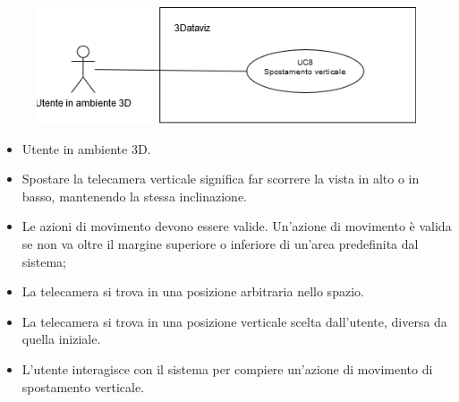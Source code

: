     \begin{figure}[h!]
        \centering
        \includegraphics[scale=0.65]{template/images/UC8.png}
        \caption{}
    \end{figure}
    \UCdsc
        { %
            \begin{itemize}
                \item Utente in ambiente 3D.
            \end{itemize}
        }
        { %
            \begin{itemize}
                \item Spostare la telecamera verticale significa far scorrere la vista in alto o in basso, mantenendo la stessa inclinazione.
            \end{itemize}
        }
        { %
            \begin{itemize}
                \item Le azioni di movimento devono essere valide. Un'azione di movimento è valida se non va oltre il margine superiore o inferiore di un'area predefinita dal sistema;
                \item La telecamera si trova in una posizione arbitraria nello spazio.
            \end{itemize}
        }
        { %
            \begin{itemize}
                \item La telecamera si trova in una posizione verticale scelta dall'utente, diversa da quella iniziale.
            \end{itemize}
        }
        { %
            \begin{itemize}
                \item L'utente interagisce con il sistema per compiere un'azione di movimento di spostamento verticale.
            \end{itemize}
        }

